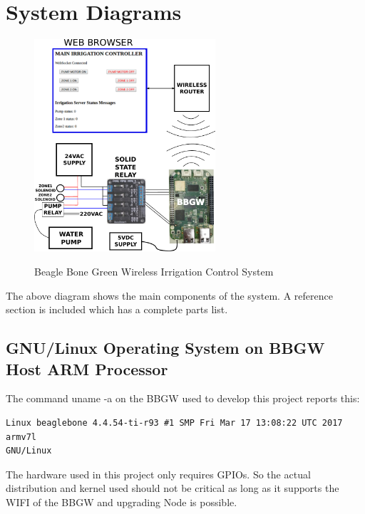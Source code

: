 %
%
%

\chapter{System Diagrams}

\begin{figure}[H]
	\centering
	\includegraphics[width=0.6\textwidth]{diagrams/system_diagram}
	\centering\bfseries
	\caption{Beagle Bone Green Wireless Irrigation Control System}
\end{figure}

The above diagram shows the main components of the system.  A reference section 
is included which has a complete parts list.


\section{GNU/Linux Operating System on BBGW Host ARM Processor}

The command uname -a on the BBGW used to develop this project reports this:

\begin{verbatim}
Linux beaglebone 4.4.54-ti-r93 #1 SMP Fri Mar 17 13:08:22 UTC 2017 armv7l 
GNU/Linux
\end{verbatim}

The hardware used in this project only requires GPIOs.  So the actual 
distribution and kernel used should not be critical as long as it supports the 
WIFI of the BBGW and upgrading Node is possible.






